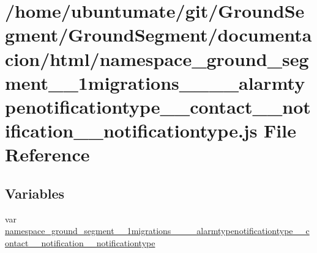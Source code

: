 \hypertarget{namespace__ground__segment__1__1migrations__1__10007____alarmtypenotificationtype____contact____4677428c861f403661b5152d1690188b}{}\section{/home/ubuntumate/git/\+Ground\+Segment/\+Ground\+Segment/documentacion/html/namespace\+\_\+ground\+\_\+segment\+\_\+\_\+1migrations\+\_\+\_\+\_\+\+\_\+alarmtypenotificationtype\+\_\+\+\_\+contact\+\_\+\+\_\+notification\+\_\+\+\_\+notificationtype.js File Reference}
\label{namespace__ground__segment__1__1migrations__1__10007____alarmtypenotificationtype____contact____4677428c861f403661b5152d1690188b}
\subsection*{Variables}
\begin{DoxyCompactItemize}
\item 
var \hyperlink{namespace__ground__segment__1__1migrations__1__10007____alarmtypenotificationtype____contact____4677428c861f403661b5152d1690188b_ac2f4a4e65ba218d185621623a380f634}{namespace\+\_\+ground\+\_\+segment\+\_\+\_\+1migrations\+\_\+\_\+\_\+\+\_\+alarmtypenotificationtype\+\_\+\+\_\+contact\+\_\+\+\_\+notification\+\_\+\+\_\+notificationtype}
\end{DoxyCompactItemize}


